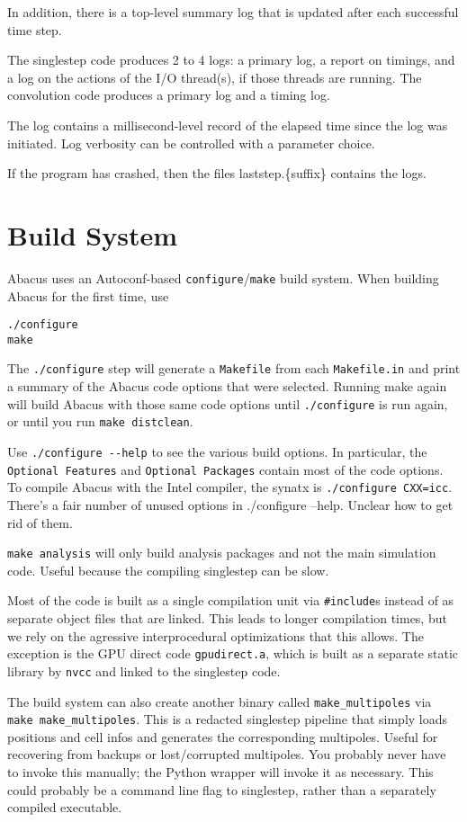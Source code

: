 \documentclass[11pt,preprint]{aastex}
\newcommand{\todo}{}
\newenvironment{private}{\comment}{\endcomment}
\newcommand{\todo}[1]{{\bf TODO: #1}}
\newenvironment{private}
    {\textbf{Not public:}\\
    \begin{tabular}{|p{0.9\textwidth}|}
    \hline\\
    }
    {
    \\\\\hline
    \end{tabular}
    }
\begin{document}
\todo{In addition, there is a top-level summary log that is updated
after each successful time step.}

The singlestep code produces 2 to 4 logs: a primary log, a report
on timings, and a log on the actions of the I/O thread(s), if those
threads are running.  The convolution code produces a primary log
and a timing log.

The log contains a millisecond-level record of the elapsed time
since the log was initiated.  Log verbosity can be controlled with
a parameter choice.

If the program has crashed, then the files laststep.\{suffix\} contains
the logs.

\begin{private}
\section{Build System}
Abacus uses an Autoconf-based \texttt{configure}/\texttt{make} build system.
When building Abacus for the first time, use
\begin{verbatim}
./configure
make
\end{verbatim}
The \verb|./configure| step will generate a \verb|Makefile| from each \verb|Makefile.in|
and print a summary of the Abacus code options
that were selected.  Running make again will build Abacus with those same code
options until \verb|./configure| is run again, or until you run \verb|make distclean|.

Use \verb|./configure --help| to see the various build options.  In particular,
the \verb|Optional Features| and \verb|Optional Packages| contain most of the code
options.  To compile Abacus with the Intel compiler, the synatx is \verb|./configure CXX=icc|.
\todo{There's a fair number of unused options in ./configure --help.  Unclear
how to get rid of them.}

\verb|make analysis| will only build analysis packages and not the main simulation
code.  Useful because the compiling singlestep can be slow.

Most of the code is built as a single compilation unit via \verb|#include|s instead
of as separate object files that are linked.  This leads to longer compilation times,
but we rely on the agressive interprocedural optimizations that this allows.
The exception is the GPU direct code \verb|gpudirect.a|, which is built as a separate
static library by \verb|nvcc| and linked to the singlestep code.

The build system can also create another binary called \verb|make_multipoles| via
\verb|make make_multipoles|.  This is a redacted singlestep pipeline that simply loads positions
and cell infos and generates the corresponding multipoles.  Useful for recovering from
backups or lost/corrupted multipoles.  You probably never have to invoke this manually;
the Python wrapper will invoke it as necessary.
\todo{This could probably be a command line flag to singlestep, rather than a
separately compiled executable.}

\end{private}
\end{document}
